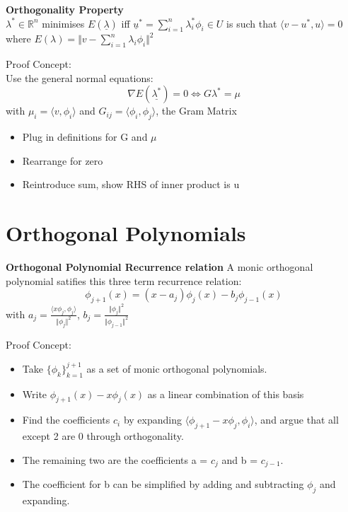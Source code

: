 \documentclass{article}
\begin{document}
\begin{theorem} \textbf{Orthogonality Property} \\
$\lambda^* \in \mathbb{R}^n$ minimises $E(\underline{\lambda})$ iff $\underline{u}^* = \sum^n_{i=1} \lambda^*_i \phi_i \in U$ is such that $\langle v -u^*, u \rangle = 0$ where $E(\lambda) = \Vert v - \sum^n_{i=1} \lambda_i \phi_i \Vert^2$

\end{theorem}
Proof Concept: \\
Use the general normal equations: $$ \nabla E(\underline{\lambda^*}) = 0 \iff G\lambda^{*} = \mu$$ with $\mu_i = \langle v, \phi_i \rangle$ and $G_{ij} = \langle \phi_i, \phi_j \rangle$, the Gram Matrix
\begin{itemize}
    \item Plug in definitions for G and $\mu$
    \item Rearrange for zero
    \item Reintroduce sum, show RHS of inner product is u
\end{itemize}
\section{Orthogonal Polynomials}
\begin{theorem} \textbf{Orthogonal Polynomial Recurrence relation}
A monic orthogonal polynomial satifies this three term recurrence relation:
$$
\phi_{j+1}(x) = (x - a_j) \phi_j(x) - b_j\phi_{j-1}(x)
$$
with $ a_j = \frac{\langle x\phi_j, \phi_j \rangle}{\Vert \phi_j \Vert^2}$, $b_j = \frac{\Vert \phi_j \Vert^2}{\Vert \phi_{j-1} \Vert^2}$
\end{theorem}
Proof Concept:
\begin{itemize}
    \item Take $\{ \phi_k \}_{k=1}^{j+1}$ as a set of monic orthogonal polynomials. 
    \item Write $\phi_{j+1}(x)- x\phi_j(x)$ as a linear combination of this basis
    \item Find the coefficients $c_i$ by expanding $\langle \phi_{j+1} - x\phi_{j} , \phi_i \rangle$, and argue that all except 2 are 0 through orthogonality. 
    \item The remaining two are the coefficients a = $c_j$ and b = $c_{j-1}$.
    \item The coefficient for b can be simplified by adding and subtracting $\phi_j$ and expanding.
\end{itemize}
\end{document}
